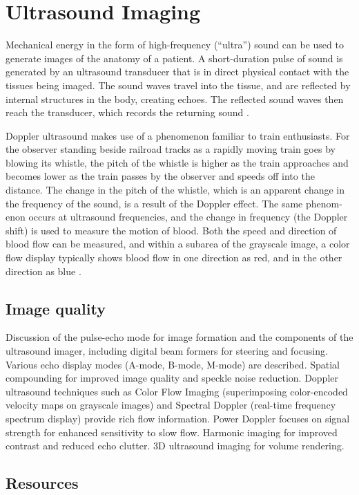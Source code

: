 \chapter{Ultrasound Imaging}

Mechanical
energy in the form of high-frequency (“ultra”) sound can be used to generate images
of the anatomy of a patient. A short-duration pulse of sound is generated by an
ultrasound transducer that is in direct physical contact with the tissues being imaged.
The sound waves travel into the tissue, and are reflected by internal structures in the
body, creating echoes. The reflected sound waves then reach the transducer, which
records the returning sound \cite{bushberg2011essential}.

Doppler ultrasound makes use of a phenomenon familiar to train enthusiasts.
For the observer standing beside railroad tracks as a rapidly moving train goes
by blowing its whistle, the pitch of the whistle is higher as the train approaches
and becomes lower as the train passes by the observer and speeds off into the
distance. The change in the pitch of the whistle, which is an apparent change in
the frequency of the sound, is a result of the Doppler effect. The same phenom-
enon occurs at ultrasound frequencies, and the change in frequency (the Doppler
shift) is used to measure the motion of blood. Both the speed and direction of
blood flow can be measured, and within a subarea of the grayscale image, a color
flow display typically shows blood flow in one direction as red, and in the other
direction as blue \cite{bushberg2011essential}.

\section{Image quality}

Discussion of the pulse-echo mode for image formation and the
components of the ultrasound imager, including digital beam formers
for steering and focusing. Various echo display modes (A-mode, B-mode,
M-mode) are described. Spatial compounding for improved image quality
and speckle noise reduction. Doppler ultrasound techniques such as
Color Flow Imaging (superimposing color-encoded velocity maps on
grayscale images) and Spectral Doppler (real-time frequency spectrum
display) provide rich flow information. Power Doppler focuses on
signal strength for enhanced sensitivity to slow flow. Harmonic
imaging for improved contrast and reduced echo clutter. 3D ultrasound
imaging for volume rendering.

\section{Resources}


